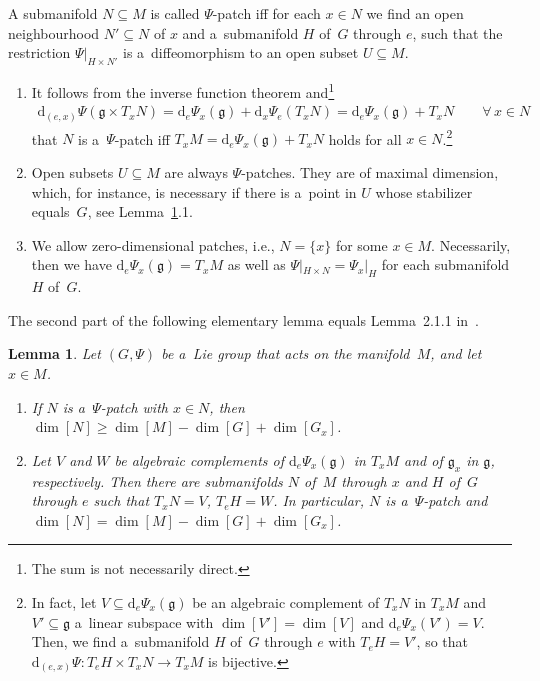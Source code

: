 \documentclass[pdftex]{sigma}
\numberwithin{equation}{section}
\newtheorem{Lemma}[Theorem]{Lemma}
\begin{document}
\begin{Definition}
A submanifold $N\subseteq M$ is called $\Psi$-patch if\/f for each $x\in N$ we find an open neighbourhood $N'\subseteq N$
of $x$ and a~submanifold $H$ of~$G$ through $e$, such that the restriction $\Psi|_{H\times N'}$ is a~dif\/feomorphism to an
open subset $U\subseteq M$.
\end{Definition}

\begin{Remark}\label{rem:patch}\quad
\begin{enumerate}\itemsep=0pt
\item
It follows from the inverse function theorem and\footnote{The sum is not necessarily direct.}
\begin{gather*}
\mathrm{d}_{(e,x)}\Psi(\mathfrak{g}\times T_xN)= \mathrm{d}_e\Psi_x(\mathfrak{g}) + \mathrm{d}_x\Psi_e(T_xN)=
\mathrm{d}_e\Psi_x(\mathfrak{g})+T_xN
\qquad\forall\, x\in N
\end{gather*}
that $N$ is a~$\Psi$-patch if\/f $T_xM= \mathrm{d}_e\Psi_x(\mathfrak{g})+T_xN$ holds for all $x\in N$.\footnote{In fact, let $V\subseteq \mathrm{d}_e\Psi_x(\mathfrak{g})$ be an algebraic complement of $T_xN$ in $T_xM$ and $V'\subseteq
\mathfrak{g}$ a~linear subspace with $\dim[V']=\dim[V]$ and $\mathrm{d}_e\Psi_x(V')=V$.
Then, we f\/ind a~submanifold $H$ of~$G$ through $e$ with $T_eH=V'$, so that $\mathrm{d}_{(e,x)}\Psi\colon T_eH\times T_xN
\rightarrow T_xM$ is bijective.}
\item
Open subsets $U\subseteq M$ are always $\Psi$-patches.
They are of maximal dimension, which, for instance, is necessary if there is a~point in $U$ whose stabilizer equals~$G$,
see Lemma~\ref{lemma:mindimslice}.1.
\item
We allow zero-dimensional patches, i.e., $N=\{x\}$ for some $x\in M$.
Necessarily, then we have $\mathrm{d}_e\Psi_x(\mathfrak{g})=T_xM$ as well as $\Psi|_{H\times N}=\Psi_x|_{H}$ for each submanifold $H$
of~$G$.
\end{enumerate}
\end{Remark}

The second part of the following elementary lemma equals Lemma~2.1.1 in~\cite{DuisKolk}.
\begin{Lemma}\label{lemma:mindimslice}
Let $(G,\Psi)$ be a~Lie group that acts on the manifold~$M$, and let $x\in M$.
\begin{enumerate}\itemsep=0pt%
\item[$1.$]
If $N$ is a~$\Psi$-patch with $x\in N$, then $\dim[N]\geq \dim[M]-\dim[G]+\dim[G_x]$.
\item[$2.$]
Let $V$ and $W$ be algebraic complements of $\mathrm{d}_e\Psi_x(\mathfrak{g})$ in $T_xM$ and of $\mathfrak{g}_x$ in
$\mathfrak{g}$, respectively.
Then there are submanifolds $N$ of~$M$ through $x$ and $H$ of~$G$ through $e$ such that $T_xN=V$, $T_eH=W$.
In particular, $N$ is a~$\Psi$-patch and $\dim[N]=\dim[M]-\dim[G]+\dim[G_x]$.
\end{enumerate}
\end{Lemma}
\end{document}
